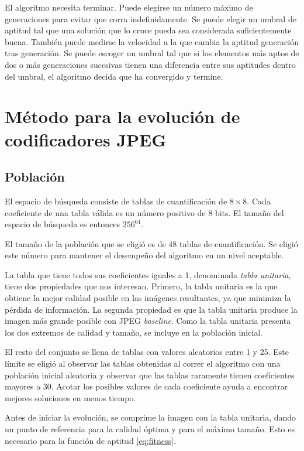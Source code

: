 El algoritmo necesita terminar. Puede elegirse un número máximo de generaciones
para evitar que corra indefinidamente. Se puede elegir un umbral de aptitud tal
que una solución que lo cruce pueda sea considerada suficientemente buena.
También puede medirse la velocidad a la que cambia la aptitud generación tras
generación. Se puede escoger un umbral tal que si los elementos más aptos de
dos o más generaciones sucesivas tienen una diferencia entre sus aptitudes
dentro del umbral, el algoritmo decida que ha convergido y termine.

\section{Método para la evolución de codificadores JPEG} \label{sec:GA}

\subsection{Población}

El espacio de búsqueda consiste de tablas de cuantificación de $8\times8$. Cada
coeficiente de una tabla válida es un número positivo de 8 bits. El tamaño del
espacio de búsqueda es entonces $256^{64}$.

El tamaño de la población que se eligió es de 48 tablas de cuantificación. Se
eligió este número para mantener el desempeño del algoritmo en un nivel
aceptable.

La tabla que tiene todos sus coeficientes iguales a 1, denominada
\emph{\gls{tabla unitaria}}, tiene dos propiedades que nos interesan. Primero,
la tabla unitaria es la que obtiene la mejor calidad posible en las imágenes
resultantes, ya que minimiza la pérdida de información. La segunda propiedad es
que la tabla unitaria produce la imagen más grande posible con JPEG
\emph{baseline}. Como la tabla unitaria presenta los dos extremos de calidad y
tamaño, se incluye en la población inicial.

El resto del conjunto se llena de tablas con valores aleatorios entre 1 y 25.
Este límite se eligió al observar las tablas obtenidas al correr el algoritmo
con una población inicial aleatoria y observar que las tablas raramente tienen
coeficientes mayores a 30. Acotar los posibles valores de cada coeficiente
ayuda a encontrar mejores soluciones en menos tiempo.

Antes de iniciar la evolución, se comprime la imagen con la tabla unitaria,
dando un punto de referencia para la calidad óptima y para el máximo tamaño.
Esto es necesario para la función de aptitud \ref{eq:fitness}.

